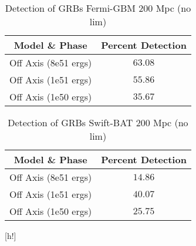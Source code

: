 \begin{table}
	\centering
	\caption{\label{FermiOnlyNoLim} Detection of GRBs Fermi-GBM 200 Mpc (no lim)}
	\begin{tabular}{|c|c|}
		\hline
		Model \& Phase       & Percent Detection \\ \hline
		Off Axis (8e51 ergs) & $63.08$           \\ \hline 
		Off Axis (1e51 ergs) & $55.86$           \\ \hline 
		Off Axis (1e50 ergs) & $35.67$           \\ \hline 
	\end{tabular}
\end{table}

\begin{table}
	\centering
	\caption{\label{SwiftOnlyNoLim} Detection of GRBs Swift-BAT 200 Mpc (no lim)}
	\begin{tabular}{|c|c|}
		\hline
		Model \& Phase       & Percent Detection \\ \hline
		Off Axis (8e51 ergs) & $14.86$           \\ \hline 
		Off Axis (1e51 ergs) & $40.07$           \\ \hline 
		Off Axis (1e50 ergs) & $25.75$           \\ \hline 
	\end{tabular}
\end{table}

\clearpage

[h!]





